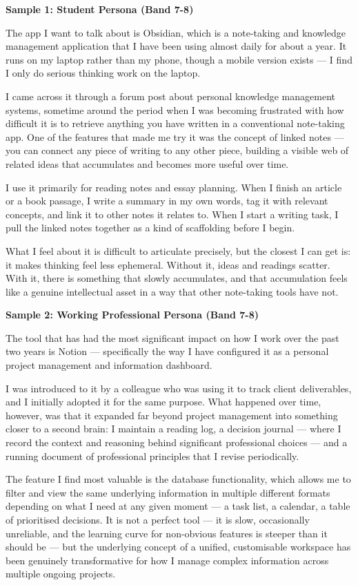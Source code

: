\begin{ieltsanswer}
\textbf{Sample 1: Student Persona (Band 7-8)}

The app I want to talk about is Obsidian, which is a note-taking and knowledge management application that I have been using almost daily for about a year. It runs on my laptop rather than my phone, though a mobile version exists — I find I only do serious thinking work on the laptop.

I came across it through a forum post about personal knowledge management systems, sometime around the period when I was becoming frustrated with how difficult it is to retrieve anything you have written in a conventional note-taking app. One of the features that made me try it was the concept of linked notes — you can connect any piece of writing to any other piece, building a visible web of related ideas that accumulates and becomes more useful over time.

I use it primarily for reading notes and essay planning. When I finish an article or a book passage, I write a summary in my own words, tag it with relevant concepts, and link it to other notes it relates to. When I start a writing task, I pull the linked notes together as a kind of scaffolding before I begin.

What I feel about it is difficult to articulate precisely, but the closest I can get is: it makes thinking feel less ephemeral. Without it, ideas and readings scatter. With it, there is something that slowly accumulates, and that accumulation feels like a genuine intellectual asset in a way that other note-taking tools have not.

\textbf{Sample 2: Working Professional Persona (Band 7-8)}

The tool that has had the most significant impact on how I work over the past two years is Notion — specifically the way I have configured it as a personal project management and information dashboard.

I was introduced to it by a colleague who was using it to track client deliverables, and I initially adopted it for the same purpose. What happened over time, however, was that it expanded far beyond project management into something closer to a second brain: I maintain a reading log, a decision journal — where I record the context and reasoning behind significant professional choices — and a running document of professional principles that I revise periodically.

The feature I find most valuable is the database functionality, which allows me to filter and view the same underlying information in multiple different formats depending on what I need at any given moment — a task list, a calendar, a table of prioritised decisions. It is not a perfect tool — it is slow, occasionally unreliable, and the learning curve for non-obvious features is steeper than it should be — but the underlying concept of a unified, customisable workspace has been genuinely transformative for how I manage complex information across multiple ongoing projects.
\end{ieltsanswer}


